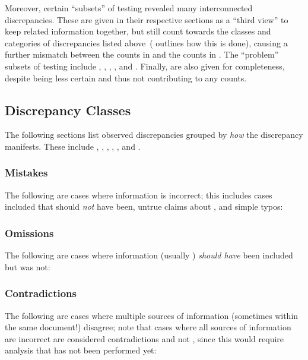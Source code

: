 Moreover, certain ``subsets'' of testing revealed many interconnected
discrepancies. These are given in their respective sections as a ``third view''
to keep related information together, but still count towards the classes and
categories of discrepancies listed above\ifnotpaper\ (
    outlines how this is done)\fi, causing a further mismatch between the counts
in  and the counts in . The ``problem'' subsets of testing include
, \ifnotpaper{}, \fi
{}, , and .
\ifnotpaper Finally,  are also given for completeness,
    despite being less certain and thus not contributing to any counts.

    \begin{bigLandscape}
        \discrepClssTable{}
        \discrepCatsTable{}
    \end{bigLandscape}

     \fi

\subsection{Discrepancy Classes}
\label{discrepClasses}

The following sections list observed discrepancies grouped by \emph{how} the
discrepancy manifests. These include , ,
, , , and \reduns{}.

\subsubsection{Mistakes}
\label{wrong}
The following are cases where information is incorrect; this includes cases
\terms{} included that should \emph{not} have been, untrue claims about
\cites{}, and simple typos:



\subsubsection{Omissions}
\label{miss}
The following are cases where information (usually ) \emph{should have}
been included but was not:



\subsubsection{Contradictions}
\label{contra}
The following are cases where multiple sources of information (sometimes within
the same document!) disagree; note that cases where all sources of information
are incorrect are considered contradictions and not , since this
would require analysis that has not been performed yet:

